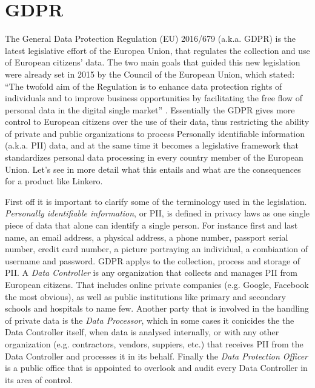 \section{GDPR}
The General Data Protection Regulation (EU) 2016/679 (a.k.a. GDPR) is the latest
legislative effort of the Europea Union, that regulates the collection
and use of European citizens' data. The two main goals that guided this new
legislation were already set in 2015 by the Council of the European Union, which
stated: ``The twofold aim of the Regulation is to enhance data protection rights
of individuals and to improve business opportunities by facilitating the free
flow of personal data in the digital single market'' \cite{CoEU956515}.
Essentially the GDPR gives more control to European citizens over the use of
their data, thus restricting the ability of private and public organizations to
process Personally identifiable information (a.k.a. PII) data, and at the same
time it becomes a legislative framework that standardizes personal data
processing in every country member of the European Union. Let's see in more
detail what this entails and what are the consequences for a product like
Linkero.

First off it is important to clarify some of the terminology used in the
legislation. \emph{Personally identifiable information}, or PII, is defined in
privacy laws as one single piece of data that alone can identify a single person. For
instance first and last name, an email address, a physical address, a phone
number, passport serial number, credit card number, a picture portraying an
individual, a combiantion of username and password. GDPR applys to the
collection, process and storage of PII. A \emph{Data Controller} is any
organization that collects and manages PII from European citizens. That includes
online private companies (e.g. Google, Facebook the most obvious), as well as
public institutions like primary and secondary schools and hospitals to name
few. Another party that is involved in the handling of private data is the
\emph{Data Processor}, which in some cases it conicides the the Data Controller
itself, when data is analysed internally, or with any other organization (e.g.
contractors, vendors, suppiers, etc.) that receives PII from the Data Controller
and processes it in its behalf. Finally the \emph{Data Protection Officer} is a
public office that is appointed to overlook and audit every Data Controller in
its area of control.

